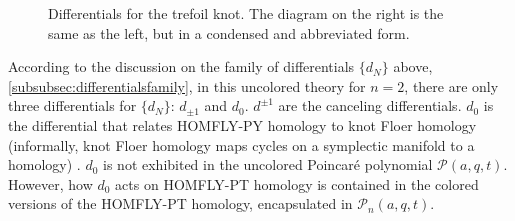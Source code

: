 \documentclass[a4paper,titlepage,twoside]{book}
\begin{document}
\begin{figure}[h]
\begin{center}
   \quad \quad \quad {}   
\end{center}
\caption{Differentials for the trefoil knot.  The diagram on the right is the same as the left, but in a condensed and abbreviated form.}\label{Fig:dotdiagramtrefoilr01}
\end{figure}

According to the discussion on the family of differentials $\lbrace d_N \rbrace$ above, \ref{subsubsec:differentialsfamily}, in this uncolored theory for $n=2$, there are only three differentials for $\lbrace d_N \rbrace$: $d_{\pm 1}$ and $d_{0}$.  $d^{\pm 1}$ are the canceling differentials.  $d_0$ is the differential that relates HOMFLY-PY homology to  knot Floer homology (informally, knot Floer homology maps cycles on a symplectic manifold to a homology)  \cite{DunfieldGukovRasmussen2005}.  $d_0$ is not exhibited in the uncolored Poincar\'{e} polynomial $\mathcal{P}{(a,q,t)}$.  However, how $d_0$ acts on HOMFLY-PT homology is contained in the colored versions of the HOMFLY-PT homology, encapsulated in $\mathcal{P}_n{(a,q,t)}$.  
\end{document}
